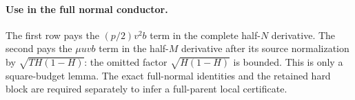\paragraph{Use in the full normal conductor.}
The first row pays the $(p/2)v^2b$ term in the complete half-$N$
derivative. The second pays the $\mu uvb$ term in the half-$M$
derivative after its source normalization by
$\sqrt{TH(1-H)}$: the omitted factor $\sqrt{H(1-H)}$ is bounded.
This is only a square-budget lemma. The exact full-normal identities
and the retained hard block are required separately to infer a
full-parent local certificate.

